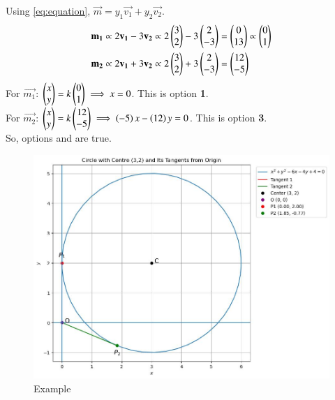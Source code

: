 \documentclass[journal]{IEEEtran}
\begin{document}
Using \eqref{eq:equation}, $\vec{m} = y_1\vec{v_1}+y_2\vec{v_2}$.
\begin{align}
    \mathbf{m_1} &\propto 2\mathbf{v_1} - 3\mathbf{v_2} \propto 2\begin{pmatrix}3 \\ 2\end{pmatrix} - 3\begin{pmatrix}2 \\ -3\end{pmatrix} = \begin{pmatrix}0 \\ 13\end{pmatrix} \propto \begin{pmatrix}0 \\ 1\end{pmatrix} \\
    \mathbf{m_2} &\propto 2\mathbf{v_1} + 3\mathbf{v_2} \propto 2\begin{pmatrix}3 \\ 2\end{pmatrix} + 3\begin{pmatrix}2 \\ -3\end{pmatrix} = \begin{pmatrix}12 \\ -5\end{pmatrix}
\end{align}
For $\vec{m_1}$: $\begin{pmatrix}x \\ y\end{pmatrix} = k\begin{pmatrix}0 \\ 1\end{pmatrix} \implies x = 0$. This is option \textbf{1}. \\
For $\vec{m_2}$: $\begin{pmatrix}x \\ y\end{pmatrix} = k\begin{pmatrix}12 \\ -5\end{pmatrix} \implies \left(-5\right)x - \left(12\right)y = 0$. This is option \textbf{3}. \\
So, options \textbf{} and \textbf{} are true.

\begin{figure}
	\centering
	\includegraphics[width=\columnwidth]{figs/plot_c.jpg}
	\caption*{Example}
	\label{fig:example}
\end{figure}
\end{document}
